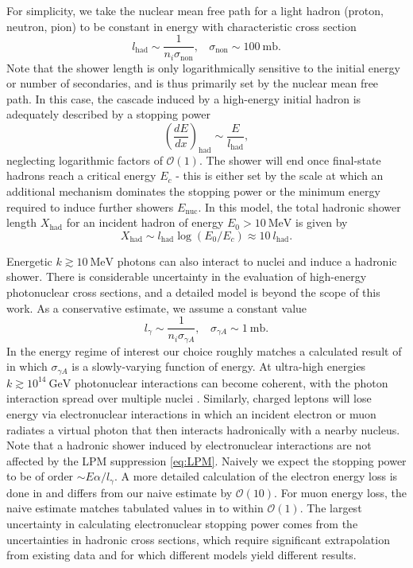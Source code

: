 \documentclass[twocolumn,showpacs,preprintnumbers,amsmath,amssymb,prd]{revtex4}
\newcommand{\OO}{\mathcal{O}}
\def\r{\right)}
\def\l{\left(}
\begin{document}
\begin{appendices}
For simplicity, we take the nuclear mean free path for a light hadron (proton, neutron, pion) to be constant in energy with characteristic cross section
\begin{equation}
l_\text{had} \sim  \frac{1}{n_i \sigma_\text{non}}, ~~~~ \sigma_\text{non} \sim 100 ~\text{mb}.
\end{equation}
Note that the shower length is only logarithmically sensitive to the initial energy or number of secondaries, and is thus primarily set by the nuclear mean free path. In this case, the cascade induced by a high-energy initial hadron is adequately described by a stopping power
\begin{equation}
\label{eq:nucshower}
\l \frac{dE}{dx}\r_\text{had} \sim \frac{E}{l_\text{had}},
\end{equation}
neglecting logarithmic factors of $\OO(1)$. The shower will end once final-state hadrons reach a critical energy $E_c$ - this is either set by the scale at which an additional mechanism dominates the stopping power or the minimum energy required to induce further showers $E_\text{nuc}$. In this model, the total hadronic shower length $X_{\text{had}}$ for an incident hadron of energy $E_0 > 10 ~\text{MeV}$ is given by
\begin{equation}
X_{\text{had}} \sim l_\text{had} \log{(E_0/E_c)} \approx 10 ~l_\text{had}.
\end{equation}
 
Energetic $k \gtrsim 10 ~\text{MeV}$ photons can also interact to nuclei and induce a hadronic shower. There is considerable uncertainty in the evaluation of high-energy photonuclear cross sections, and a detailed model is beyond the scope of this work. As a conservative estimate, we assume a constant value
\begin{equation}
l_\gamma \sim \frac{1}{n_i \sigma_{\gamma A}}, ~~~~ \sigma_{\gamma A} \sim 1 ~\text{mb}.
\end{equation}
In the energy regime of interest our choice roughly matches a calculated result of \cite{Klein} in which $\sigma_{\gamma A}$ is a slowly-varying function of energy. At ultra-high energies $k \gtrsim 10^{14} ~\text{GeV}$ photonuclear interactions can become coherent, with the photon interaction spread over multiple nuclei \cite{PDG}. Similarly, charged leptons will lose energy via electronuclear interactions in which an incident electron or muon radiates a virtual photon that then interacts hadronically with a nearby nucleus. Note that a hadronic shower induced by electronuclear interactions are not affected by the LPM suppression \eqref{eq:LPM}. Naively we expect the stopping power to be of order $\sim E \alpha/l_\gamma$. A more detailed calculation of the electron energy loss is done in \cite{Klein} and differs from our naive estimate by $\OO(10)$. For muon energy loss, the naive estimate matches tabulated values in \cite{PDG} to within $\OO(1)$. The largest uncertainty in calculating electronuclear stopping power comes from the uncertainties in hadronic cross sections, which require significant extrapolation from existing data and for which different models yield different results. 

\end{appendices}
\end{document}
